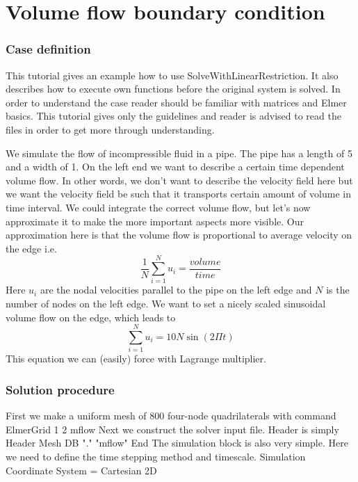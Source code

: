 \chapter{Volume flow boundary condition}


\subsection*{Case definition}

This tutorial gives an example how to use SolveWithLinearRestriction. It also describes
how to execute own functions before the original system is solved. In order to
understand the case reader should be familiar with  matrices and
Elmer basics. This tutorial gives only the guidelines and reader is advised to
read the files in order to get more through understanding.

We simulate the flow of incompressible fluid in a pipe.
The pipe has a length of 5 and a width of 1. On the left end we want to describe
a certain time dependent volume flow. In other words, we don't want to describe the velocity field
here but we want the velocity field be such that it transports certain amount of volume
in time interval. We could integrate the correct volume flow, but let's now approximate it
to make the more important aspects more visible. Our approximation here is that the volume
flow is proportional to average velocity on the edge i.e.
\begin{equation}
\frac{1}{N}\sum_{i=1}^{N}u_i = \frac{volume}{time}
\end{equation}
Here $u_i$ are the nodal velocities parallel to the pipe on the left edge and $N$ is the number of nodes on
the left edge. We want to set a nicely scaled sinusoidal volume flow on the edge, which leads to
\begin{equation}
\sum_{i=1}^{N}u_i = 10N\sin(2\Pi t)
\end{equation}
This equation we can (easily) force with Lagrange multiplier.

\subsection*{Solution procedure}
First we make a uniform mesh of 800 four-node quadrilaterals with command
\ttbegin
ElmerGrid 1 2 mflow
\ttend
Next we construct the solver input file. Header is simply
\ttbegin
Header
  Mesh DB "." "mflow"
End
\ttend
The simulation block is also very simple. 
Here we need to define the time stepping method and timescale.
\ttbegin
Simulation
  Coordinate System = Cartesian 2D

